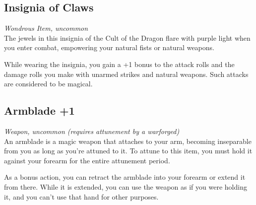 \documentclass[letterpaper,openany,oneside,twocolumn]{book}
\begin{document}
\subsection*{Insignia of Claws}
\textit{Wondrous Item, uncommon}\\
The jewels in this insignia of the Cult of the Dragon flare with purple light when you enter combat, empowering your natural fists or natural weapons.

While wearing the insignia, you gain a +1 bonus to the attack rolls and the damage rolls you make with unarmed strikes and natural weapons. Such attacks are considered to be magical.

\subsection*{Armblade +1}
\textit{Weapon, uncommon (requires attunement by a warforged)}\\
An armblade is a magic weapon that attaches to your arm, becoming inseparable from you as long as you're attuned to it. To attune to this item, you must hold it against your forearm for the entire attunement period.

As a bonus action, you can retract the armblade into your forearm or extend it from there. While it is extended, you can use the weapon as if you were holding it, and you can't use that hand for other purposes.
\end{document}
